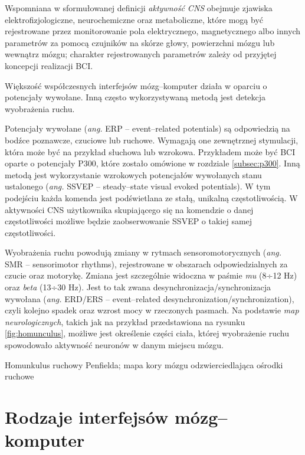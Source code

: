 \documentclass[skorowidz,skroty]{dyplomWEZUT}
\begin{document}
Wspomniana w sformułowanej definicji \textit{aktywność CNS} obejmuje zjawiska elektrofizjologiczne, neurochemiczne oraz metaboliczne, które mogą być rejestrowane przez monitorowanie pola elektrycznego, magnetycznego albo innych parametrów za pomocą czujników na skórze głowy, powierzchni mózgu lub wewnątrz mózgu\cite{bci_principles}; charakter rejestrowanych parametrów zależy od przyjętej koncepcji realizacji BCI. 

Większość współczesnych interfejsów mózg--komputer działa w oparciu o potencjały wywołane\cite{bci_revolutionizing,eeg_features}. Inną często wykorzystywaną metodą jest detekcja wyobrażenia ruchu\cite{bci_revolutionizing}.

Potencjały wywołane (\textit{ang.} ERP -- event--related potentials) są odpowiedzią na bodźce poznawcze, czuciowe lub ruchowe\cite{eeg_features}. Wymagają one zewnętrznej stymulacji, która może być na przykład słuchowa lub wzrokowa. Przykładem może być BCI oparte o potencjały P300, które zostało omówione w rozdziale \vref{subsec:p300}. Inną metodą jest wykorzystanie wzrokowych potencjałów wywołanych stanu ustalonego (\textit{ang.} SSVEP -- steady--state visual evoked potentials). W tym podejściu każda komenda jest podświetlana ze stałą, unikalną częstotliwością\cite{bci_revolutionizing}. W aktywności CNS użytkownika skupiającego się na komendzie o danej częstotliwości możliwe będzie zaobserwowanie SSVEP o takiej samej częstotliwości.

Wyobrażenia ruchu powodują zmiany w rytmach sensoromotorycznych (\textit{ang.} SMR -- sensorimotor rhythms), rejestrowane w obszarach odpowiedzialnych za czucie oraz motorykę\cite{bci_revolutionizing}. Zmiana jest szczególnie widoczna w paśmie \textit{mu} (8÷12 Hz) oraz \textit{beta} (13÷30 Hz)\cite{bci_introduction}. Jest to tak zwana desynchronizacja/synchronizacja wywołana (\textit{ang.} ERD/ERS -- event--related desynchronization/synchronization), czyli kolejno spadek oraz wzrost mocy w rzeczonych pasmach. Na podstawie \textit{map neurologicznych}, takich jak na przykład przedstawiona na rysunku \vref{fig:homunculus}, możliwe jest określenie części ciała, której wyobrażenie ruchu spowodowało aktywność neuronów w danym miejscu mózgu.


{Homunkulus ruchowy Penfielda; mapa kory mózgu odzwierciedlająca ośrodki ruchowe\label{fig:homunculus}}
{\cite{bci_principles}}

\section{Rodzaje interfejsów mózg--komputer}
\end{document}
